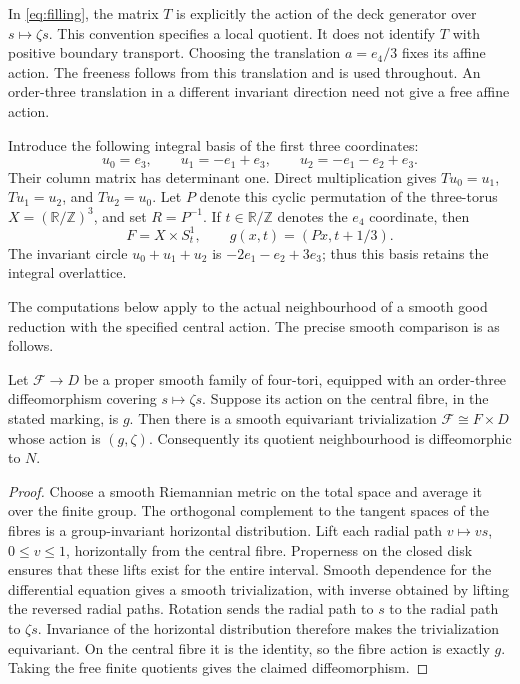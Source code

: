 \documentclass[11pt]{article}
\numberwithin{equation}{section}
\providecommand{\Z}{\mathbb Z}
\begin{document}
In \eqref{eq:filling}, the matrix $T$ is explicitly the action of
the deck generator over $s\mapsto\zeta s$. This convention specifies
a local quotient. It does not identify $T$ with positive boundary
transport. Choosing the translation $a=e_4/3$ fixes its affine action. The freeness follows from this
translation and is used throughout. An order-three translation in a
different invariant direction need not give a free affine action.

Introduce the following integral basis of the first three coordinates:
\begin{equation}\label{eq:permutation-basis}
 u_0=e_3,\qquad u_1=-e_1+e_3,\qquad
 u_2=-e_1-e_2+e_3.
\end{equation}
Their column matrix has determinant one. Direct multiplication gives
$Tu_0=u_1$, $Tu_1=u_2$, and $Tu_2=u_0$.
Let $P$ denote this cyclic permutation of the three-torus
$X=(\mathbb R/\Z)^3$, and set $R=P^{-1}$.
If $t\in\mathbb R/\Z$ denotes the $e_4$ coordinate, then
\begin{equation}\label{eq:affine-product}
 F=X\times S^1_t,\qquad g(x,t)=(Px,t+1/3).
\end{equation}
The invariant circle $u_0+u_1+u_2$ is
$-2e_1-e_2+3e_3$; thus this basis retains the integral overlattice.

The computations below apply to the actual neighbourhood of a smooth
good reduction with the specified central action. The precise smooth
comparison is as follows.

\begin{proposition}\label{prop:family}
Let $\mathcal F\to D$ be a proper smooth family of four-tori,
equipped with an order-three diffeomorphism covering $s\mapsto\zeta s$.
Suppose its action on the central fibre, in the stated marking, is $g$.
Then there is a smooth equivariant trivialization
$\mathcal F\cong F\times D$ whose action is $(g,\zeta)$.
Consequently its quotient neighbourhood is diffeomorphic to $N$.
\end{proposition}
\begin{proof}
Choose a smooth Riemannian metric on the total space and average it
over the finite group. The orthogonal complement to the tangent spaces
of the fibres is a group-invariant horizontal distribution. Lift each
radial path $v\mapsto vs$, $0\le v\le1$, horizontally from the
central fibre. Properness on the closed disk ensures that these lifts
exist for the entire interval. Smooth dependence for the differential
equation gives a smooth trivialization, with inverse obtained by lifting
the reversed radial paths. Rotation sends the radial path to $s$ to
the radial path to $\zeta s$. Invariance of the horizontal distribution
therefore makes the trivialization equivariant. On the central fibre
it is the identity, so the fibre action is exactly $g$.
Taking the free finite quotients gives the claimed diffeomorphism.
\end{proof}
\end{document}
